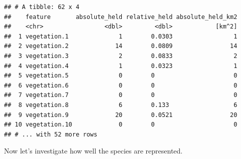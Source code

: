 \documentclass[12pt,]{book}
\newenvironment{Shaded}{\begin{snugshade}}{\end{snugshade}}
\newcommand{\KeywordTok}[1]{\textcolor[rgb]{0.13,0.29,0.53}{\textbf{#1}}}
\newcommand{\DecValTok}[1]{\textcolor[rgb]{0.00,0.00,0.81}{#1}}
\newcommand{\StringTok}[1]{\textcolor[rgb]{0.31,0.60,0.02}{#1}}
\newcommand{\CommentTok}[1]{\textcolor[rgb]{0.56,0.35,0.01}{\textit{#1}}}
\newcommand{\OperatorTok}[1]{\textcolor[rgb]{0.81,0.36,0.00}{\textbf{#1}}}
\newcommand{\NormalTok}[1]{#1}
\begin{document}
\begin{Shaded}
\end{Shaded}

\begin{verbatim}
## # A tibble: 62 x 4
##    feature       absolute_held relative_held absolute_held_km2
##    <chr>                 <dbl>         <dbl>            [km^2]
##  1 vegetation.1              1        0.0303                 1
##  2 vegetation.2             14        0.0809                14
##  3 vegetation.3              2        0.0833                 2
##  4 vegetation.4              1        0.0323                 1
##  5 vegetation.5              0        0                      0
##  6 vegetation.6              0        0                      0
##  7 vegetation.7              0        0                      0
##  8 vegetation.8              6        0.133                  6
##  9 vegetation.9             20        0.0521                20
## 10 vegetation.10             0        0                      0
## # ... with 52 more rows
\end{verbatim}

Now let's investigate how well the species are represented.
\end{document}
